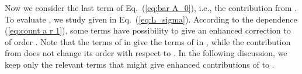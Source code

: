 \documentclass[a4paper,showpacs,preprintnumbers,amsmath,amssymb]{revtex4}
\begin{document}
Now we consider the last term of Eq.~(\ref{eq:bar A_0}), i.e., the contribution  from \coordHE{}.
To evaluate \coordHE{}, we study \coordHE{} given in Eq.~(\ref{eq:L_sigma}). 
According to the dependence (\ref{eq:count a r 1}), some terms have possibility to give an enhanced correction to \coordHE{} of order \coordHE{}. 
Note that the terms of \coordHE{} in \coordHE{} give the terms of \coordHE{} in \coordHE{}, while the contribution from \coordHE{} does not change its order with respect to \coordHE{}. 
In the following discussion, we keep only the relevant terms that might give enhanced contributions of \coordHE{} to \coordHE{}. 
\end{document}
